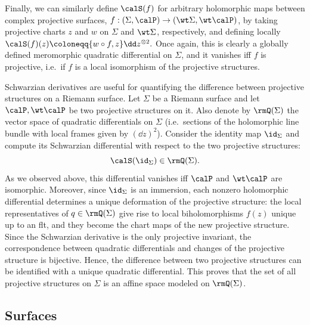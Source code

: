 \begin{rem}
    Finally, we can similarly define $\calS(f)$ for arbitrary holomorphic maps between complex projective surfaces, $f:(\Sigma,\calP)\to (\wt\Sigma,\wt\calP)$, by taking projective charts $z$ and $w$ on $\Sigma$ and $\wt\Sigma$, respectively, and defining locally 
    $\calS(f)(z)\coloneqq \{w\circ f,z\}\dd z^{\otimes 2}.$
    Once again, this is clearly a globally defined meromorphic quadratic differential on $\Sigma$, and it vanishes iff $f$ is projective, i.e.\ if $f$ is a local isomorphism of the projective structures.
\end{rem}

\begin{rem}
    Schwarzian derivatives are useful for quantifying the difference between projective structures on a Riemann surface. Let $\Sigma$ be a Riemann surface and let $\calP,\wt\calP$ be two projective structures on it. Also denote by $\rmQ(\Sigma)$ the vector space of quadratic differentials on $\Sigma$ (i.e.\ sections of the holomorphic line bundle with local frames given by $(\dd z)^2$). Consider the identity map $\id_\Sigma$ and compute its Schwarzian differential with respect to the two projective structures:
    \[\calS(\id_\Sigma)\in \rmQ(\Sigma).\]
    As we observed above, this differential vanishes iff $\calP$ and $\wt\calP$ are isomorphic. Moreover, since $\id_\Sigma$ is an immersion, each nonzero holomorphic differential determines a unique deformation of the projective structure: the local representatives of $q\in\rmQ(\Sigma)$ give rise to local biholomorphisms $f(z)$ unique up to an \gls{flt}, and they become the chart maps of the new projective structure. Since the Schwarzian derivative is the only projective invariant, the correspondence between quadratic differentials and changes of the projective structure is bijective. Hence, the difference between two projective structures can be identified with a unique quadratic differential. This proves that the set of all projective structures on $\Sigma$ is an affine space modeled on $\rmQ(\Sigma)$.
\end{rem}










\subsection{Surfaces}\label{sec: theory of surfaces}


